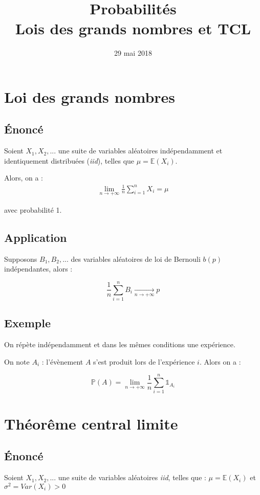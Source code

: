 \documentclass{article}
\title{%
  Probabilités \\
  \large Lois des grands nombres et TCL}
\date{29 mai 2018}
\begin{document}
\maketitle

\section{Loi des grands nombres}

\subsection{Énoncé}
Soient $X_1, X_2,...$ une suite de variables aléatoires indépendamment et
identiquement distribuées (\textit{iid}), telles que $\mu = \mathbb{E}(X_i)$.

Alors, on a :
\begin{align*}
  \lim_{n \to + \infty} \frac{1}{n} \sum_{i=1}^n X_i = \mu
\end{align*}

avec probabilité 1.

\subsection{Application}

Supposons $B_1,B_2,...$ des variables aléatoires de loi de Bernouli $b(p)$
indépendantes, alors :

$$ \frac{1}{n} \sum_{i=1}^n B_i \xrightarrow[n \to + \infty]{} p $$

\subsection{Exemple}
On répète indépendamment et dans les mêmes conditions une expérience.

On note $A_i$ : l'évènement $A$ s'est produit lors de l'expérience $i$.
Alors on a :

$$ \mathbb{P}(A) = \lim_{n \to + \infty} \frac{1}{n} \sum_{i=1}^n \mathds{1}_{A_i} $$

\section{Théorême central limite}

\subsection{Énoncé}
Soient $X_1, X_2,...$ une suite de variables aléatoires \textit{iid}, telles
que :
$ \mu = \mathbb{E}(X_i) $ et $\sigma^2 = \textit{Var}(X_i) > 0 $
\end{document}
